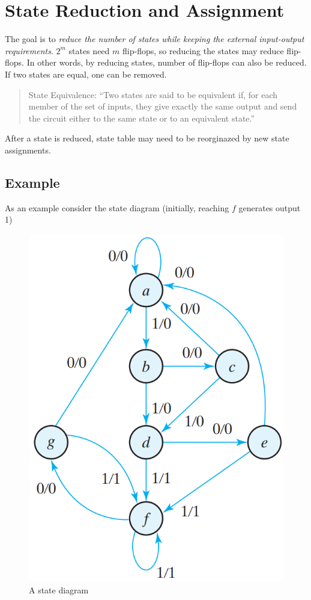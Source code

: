 \section{State Reduction and Assignment}
\label{sec:state-reduction-and-assignment}

The goal is to \textit{reduce the number of states while keeping the external input-output requirements}. $2^m$ states need $m$ flip-flops, so reducing the states may reduce flip-flops. In other words, by reducing states, number of flip-flops can also be reduced. If two states are equal, one can be removed.
\begin{quote}
  State Equivalence: ``Two states are said to be equivalent if, for each member of the set of inputs, they give exactly the same output and send the circuit either to the same state or to an equivalent state.''
\end{quote}
\noindent After a state is reduced, state table may need to be reorginazed by new state assignments.

\subsection*{Example}

As an example consider the state diagram (initially, reaching $f$ generates output 1)
\begin{figure}[H]
  \centering
  \includegraphics[width=.7\linewidth]{img/fig-5.25.png}
  \caption{A state diagram}
  \label{fig:fig5.25}
\end{figure}

